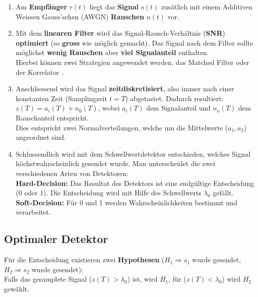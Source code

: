 \begin{enumerate}
  \item Am \textbf{Empfänger} $r(t)$ liegt das \textbf{Signal} $s(t)$ zusätlich mit einem Additiven 
  		Weissen Gauss'schen (AWGN) \textbf{Rauschen} $n(t)$ vor.
  \item Mit dem \textbf{linearen Filter} wird das Signal-Rausch-Verhältnis (\textbf{SNR})
		\textbf{optimiert} (so \textbf{gross} wie möglich gemacht). Das Signal nach dem Filter sollte
		möglichst \textbf{wenig Rauschen} aber \textbf{viel Signalanteil} enthalten. \\
		Hierbei können zwei Strategien angewendet werden, das Matched Filter 
		 oder der Korrelator
		.
  \item Anschliessend wird das Signal \textbf{zeitdiskretisiert}, also immer nach einer konstanten Zeit
  		(Samplingzeit $t = T$) abgetastet. Dadurch resultiert: $z(T) = a_i(T) + n_0(T)$, wobei $a_i(T)$
  		dem Signalanteil und $n_o(T)$ dem Rauschanteil entspricht. \\
  		Dies entspricht zwei Normalverteilungen, welche um die Mittelwerte ($a_1, a_2$) angeordnet sind.
  \item Schlussendlich wird mit dem Schwellwertdetektor entschieden, welches Signal
  		höchstwahrscheinlich gesendet wurde. Man unterscheidet die zwei verschiedenen Arten von
  		Detektoren: \\ \textbf{Hard-Decision:} Das Resultat des Detektors ist eine endgültige
  		Entscheidung (0 oder 1). Die Entscheidung wird mit Hilfe des Schwellwerts $\lambda_0$ gefällt.\\ 
  		\textbf{Soft-Decision:} Für 0 und 1 werden Wahrscheinlichkeiten bestimmt und verarbeitet.
\end{enumerate}

\subsection{Optimaler Detektor}
	Für die Entscheidung existieren zwei \textbf{Hypothesen} ($H_1 \Rightarrow s_1$ wurde gesendet, 
	$H_2 \Rightarrow s_2$ wurde gesendet): \\ 
	Falls das gesamplete Signal ($z(T) > \lambda_0$) ist, wird $H_1$, 
	für ($z(T) < \lambda_0$) wird $H_2$ gewählt. \\

